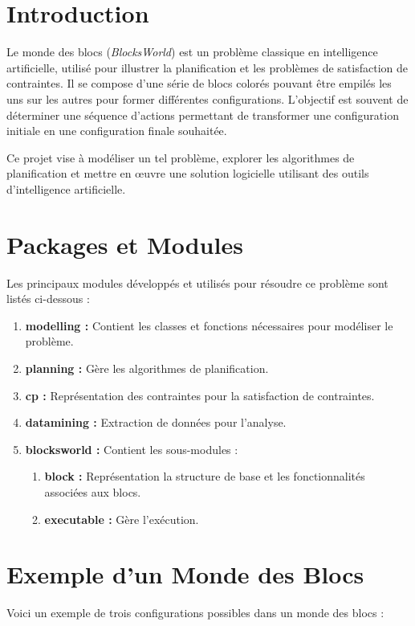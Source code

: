 \documentclass[a4paper,12pt]{article} %
\begin{document}
\tableofcontents
\newpage

\section{Introduction}
Le monde des blocs (\emph{BlocksWorld}) est un problème classique en intelligence artificielle, utilisé pour illustrer la planification et les problèmes de satisfaction de contraintes. Il se compose d'une série de blocs colorés pouvant être empilés les uns sur les autres pour former différentes configurations. L'objectif est souvent de déterminer une séquence d'actions permettant de transformer une configuration initiale en une configuration finale souhaitée.

Ce projet vise à modéliser un tel problème, explorer les algorithmes de planification et mettre en œuvre une solution logicielle utilisant des outils d'intelligence artificielle.

\section{Packages et Modules}
Les principaux modules développés et utilisés pour résoudre ce problème sont listés ci-dessous :

\begin{enumerate}
    \item \textbf{modelling :} Contient les classes et fonctions nécessaires pour modéliser le problème.
    \item \textbf{planning :} Gère les algorithmes de planification.
    \item \textbf{cp :} Représentation des contraintes pour la satisfaction de contraintes.
    \item \textbf{datamining :} Extraction de données pour l'analyse.
    \item \textbf{blocksworld :} Contient les sous-modules :
    \begin{enumerate}
        \item \textbf{block :} Représentation la structure de base et les fonctionnalités associées aux blocs.
        \item \textbf{executable :} Gère l'exécution.
    \end{enumerate}
\end{enumerate}

\section{Exemple d’un Monde des Blocs}
Voici un exemple de trois configurations possibles dans un monde des blocs :
\end{document}
